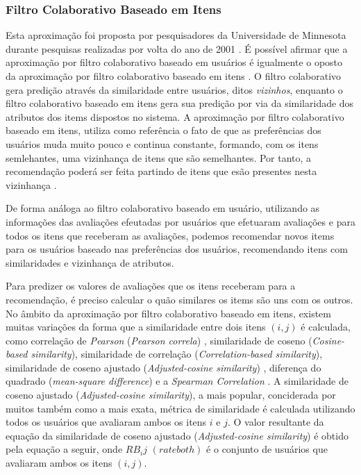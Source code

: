 \documentclass[12pt,
				openright,
				twoside,
				a4paper,
				apter=TITLE,
				section=TITLE,
				subsection=TITLE,
				chapter=TITLE,
				english,
				french,
				spanish,
				brazil]{abntex2}
\begin{document}
\subsubsection{Filtro Colaborativo Baseado em Itens}
Esta aproximação foi proposta por pesquisadores da Universidade de Minnesota durante pesquisas realizadas por volta do ano de 2001 \cite{sarwar2001item}. É possível afirmar que a aproximação por filtro colaborativo baseado em usuários é igualmente o oposto da aproximação por filtro colaborativo baseado em itens \cite{schafer2007collaborative}. O filtro colaborativo gera predição através da similaridade entre usuários, ditos \textit{vizinhos}, enquanto o filtro colaborativo baseado em itens gera sua predição por via da similaridade dos atributos dos items dispostos no sistema. A aproximação por filtro colaborativo baseado em itens, utiliza como referência o fato de que as preferências dos usuários muda muito pouco e continua constante, formando, com os itens semlehantes, uma vizinhança de itens que são semelhantes. Por tanto, a recomendação poderá ser feita partindo de itens que esão presentes nesta vizinhança \cite{asanov2011algorithms}.

De forma análoga ao filtro colaborativo baseado em usuário, utilizando as informações das avaliações efeutadas por usuários que efetuaram avaliações e para todos os itens que receberam as avaliações, podemos recomendar novos items para os usuários baseado nas preferências dos usuários, recomendando itens com similaridades e vizinhança de atributos. 

Para predizer os valores de avaliações que os itens receberam para a recomendação, é preciso calcular o quão similares os items são uns com os outros. No âmbito da aproximação por filtro colaborativo baseado em itens, existem muitas variações da forma que a similaridade entre dois itens $(i, j)$ é calculada, como correlação de \textit{Pearson} (\textit{Pearson correla}) \cite{herlocker2000understanding}, similaridade de coseno (\textit{Cosine-based similarity}), similaridade de correlação (\textit{Correlation-based similarity}), similaridade de coseno ajustado (\textit{Adjusted-cosine similarity}) \cite{sarwar2001item}, diferença do quadrado (\textit{mean-square difference}) \cite{shardanand1995social} e a \textit{Spearman Correlation} \cite{massa2004using}. A similaridade de coseno ajustado (\textit{Adjusted-cosine similarity}), a mais popular, conciderada por muitos também como a mais exata, métrica de similaridade é calculada utilizando todos os usuários que avaliaram ambos os itens $i$ e $j$. O valor resultante da equação da similaridade de coseno ajustado (\textit{Adjusted-cosine similarity}) é obtido pela equação a seguir, onde $RB_ij$ $(rate both)$ é o conjunto de usuários que avaliaram ambos os itens $(i, j)$.
\end{document}
